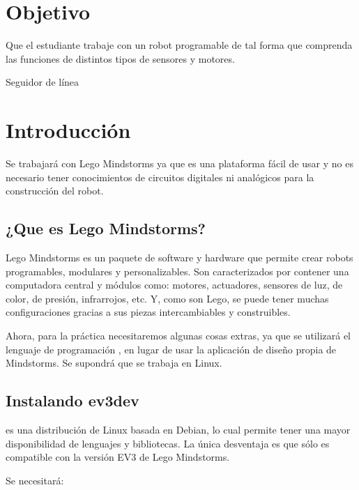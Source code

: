 
\section{Objetivo}
\noindent Que el estudiante trabaje con un robot programable de tal forma que comprenda las funciones de distintos tipos de sensores y motores.

\begin{auxcode}
 \caption{Seguidor de línea}
 \centering
\end{auxcode}

\section{Introducci\'on}

Se trabajará con Lego Mindstorms ya que es una plataforma fácil de usar y no es necesario tener conocimientos de circuitos digitales ni analógicos para la construcción del robot.

\subsection{¿Que es Lego Mindstorms?}

Lego Mindstorms es un paquete de software y hardware que permite crear robots programables, modulares y personalizables. Son caracterizados por contener una computadora central y módulos como: motores, actuadores, sensores de luz, de color, de presión, infrarrojos, etc. Y, como son Lego, se puede tener muchas configuraciones gracias a sus piezas intercambiables y construibles.


Ahora, para la práctica necesitaremos algunas cosas extras, ya que se utilizará el lenguaje de programación , en lugar de usar la aplicación de diseño propia de Mindstorms. Se supondrá que se trabaja en Linux.

\subsection{Instalando ev3dev}

 es una distribución de Linux basada en Debian, lo cual permite tener una mayor disponibilidad de lenguajes y bibliotecas. La única desventaja es que sólo es compatible con la versión EV3 de Lego Mindstorms.

\noindent Se necesitará:

